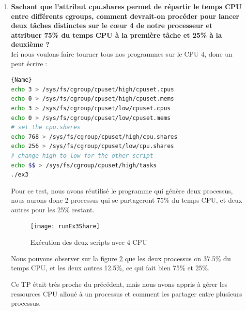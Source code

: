 \documentclass[
	a4paper, %
	10pt, %
]{CSUniSchoolLabReport}
\begin{document}
\begin{enumerate}[label=\textbf{\arabic*}]
En modifiant les lignes 6 et 8, nous pouvons faire en sorte que les processus se r\'epartissent sur les 4 CPU, et non pas seulement 2.
\begin{lstlisting}[language=bash, firstnumber=1]{Name}
echo 2-3 > /sys/fs/cgroup/cpuset/high/cpuset.cpus
echo 0 > /sys/fs/cgroup/cpuset/high/cpuset.mems
echo 0-1 > /sys/fs/cgroup/cpuset/low/cpuset.cpus
echo 0 > /sys/fs/cgroup/cpuset/low/cpuset.mems
\end{lstlisting}

\begin{figure}[H]
	\centering
	\texttt{[image: MPEx3HighLow4CPU]}
	\caption{Ex\'ecution des deux scripts avec 4 CPU}
	\label{fig:MPEx3HighLow4CPU}
\end{figure}

\newpage
	\item \textbf{Sachant que l’attribut cpu.shares permet de répartir le temps CPU entre différents cgroups, comment devrait-on procéder pour lancer deux tâches distinctes sur le cœur 4 de notre processeur et attribuer 75\% du temps CPU à la première tâche et 25\% à la deuxième ?}\\

Ici nous voulons faire tourner tous nos programmes sur le CPU 4, donc un peut \'ecrire :
\begin{lstlisting}[language=bash, firstnumber=1]{Name}
echo 3 > /sys/fs/cgroup/cpuset/high/cpuset.cpus
echo 0 > /sys/fs/cgroup/cpuset/high/cpuset.mems
echo 3 > /sys/fs/cgroup/cpuset/low/cpuset.cpus
echo 0 > /sys/fs/cgroup/cpuset/low/cpuset.mems
# set the cpu.shares
echo 768 > /sys/fs/cgroup/cpuset/high/cpu.shares
echo 256 > /sys/fs/cgroup/cpuset/low/cpu.shares
# change high to low for the other script
echo $$ > /sys/fs/cgroup/cpuset/high/tasks 
./ex3
\end{lstlisting}
Pour ce test, nous avons réutilis\'e le programme qui g\'en\`ere deux processus, nous aurons donc 2 processus qui se partageront 75\% du temps CPU, et deux autres pour les 25\% restant.
\begin{figure}[H]
	\centering
	\texttt{[image: runEx3Share]}
	\caption{Ex\'ecution des deux scripts avec 4 CPU}
	\label{fig:runEx3Share}
\end{figure}
Nous pouvons observer sur la figure \ref{fig:runEx3Share} que les deux processus on 37.5\% du temps CPU, et les deux autres 12.5\%, ce qui fait bien 75\% et 25\%.

Ce TP était tr\`es proche du pr\'ec\'edent, mais nous avons appris à g\'erer les ressources CPU alloué à un processus et comment les partager entre plusieurs processus.
\end{enumerate}
\end{document}
